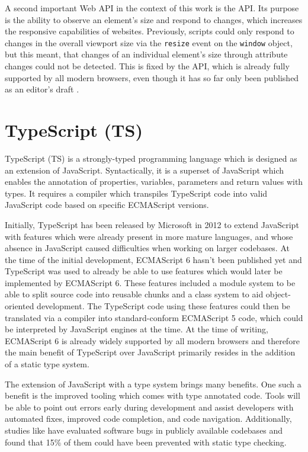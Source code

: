 A second important Web API in the context of this work is the  API. 
Its purpose is the ability to observe an element's size and respond to changes, which increases the responsive capabilities of websites. 
Previously, scripts could only respond to changes in the overall viewport size via the \lstinline{resize} event on the \lstinline{window} object, but this meant, that changes of an individual element's size through attribute changes could not be detected. 
This is fixed by the  API, which is already fully supported by all modern browsers, even though it has so far only been published as an editor's draft \parencite{ResizeObserver}.

\section{TypeScript (TS)}
\label{sec:TS}

TypeScript (TS) is a strongly-typed programming language which is designed as an extension of JavaScript. 
Syntactically, it is a superset of JavaScript which enables the annotation of properties, variables, parameters and return values with types. 
It requires a compiler which transpiles TypeScript code into valid JavaScript code based on specific ECMAScript versions.

Initially, TypeScript has been released by Microsoft in 2012 \parencite{TSFirstRelease} to extend JavaScript with features which were already present in more mature languages, and whose absence in JavaScript caused difficulties when working on larger codebases. 
At the time of the initial development, ECMAScript 6 hasn't been published yet and TypeScript was used to already be able to use features which would later be implemented by ECMAScript 6.
These features included a module system to be able to split source code into reusable chunks and a class system to aid object-oriented development. 
The TypeScript code using these features could then be translated via a compiler into standard-conform ECMAScript 5 code, which could be interpreted by JavaScript engines at the time. 
At the time of writing, ECMAScript 6 is already widely supported by all modern browsers and therefore the main benefit of TypeScript over JavaScript primarily resides in the addition of a static type system.

The extension of JavaScript with a type system brings many benefits. 
One such a benefit is the improved tooling which comes with type annotated code. 
Tools will be able to point out errors early during development and assist developers with automated fixes, improved code completion, and code navigation. 
Additionally, studies like \cite{ToTypeOrNotToType} have evaluated software bugs in publicly available codebases and found that 15\% of them could have been prevented with static type checking.

